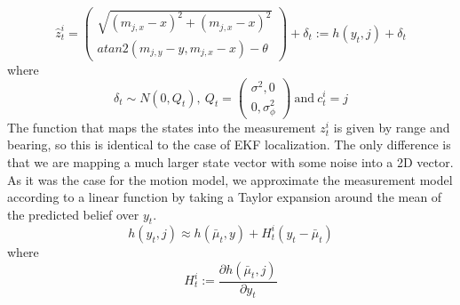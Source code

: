 \begin{equation}
    \hat{z}_{t}^{i} = 
        \begin{pmatrix}
            \sqrt{(m_{j,x} - x)^{2} 
            + (m_{j,x} - x)^{2}} \\
            atan2(m_{j,y} - y, 
            m_{j,x} -x) - \theta
            \end{pmatrix} 
            + \delta_{t} := h(y_{t},j) + \delta_{t}
\end{equation}
where \\
\begin{equation*}
    \delta_{t} \sim N(0,Q_{t}),\  Q_{t} = 
    \begin{pmatrix}
    \sigma^{2}, 0 \\
    0, \sigma_{\phi}^{2}
    \end{pmatrix}
    \ \text{and} \ c^{i}_{t} = j
\end{equation*}
The function that maps the states into the measurement $z^{i}_t$ is given by range and bearing, so this is identical to the case of EKF localization. The only difference is that we are mapping a much larger state vector with some noise into a 2D vector. As it was the case for the motion model, we approximate the measurement model according to a linear function by taking a Taylor expansion around the mean of the predicted belief over $y_{t}$.
\begin{equation}
    h(y_{t},j) \approx h(\bar{\mu}_{t}, y) + H^{i}_{t}(y_{t} - \bar{\mu}_{t})
\end{equation}
where
\begin{equation*}
    H^{i}_{t} := \frac{\partial{h(\bar{\mu}_{t}, j)}}{\partial{y_{t}}}
\end{equation*}

